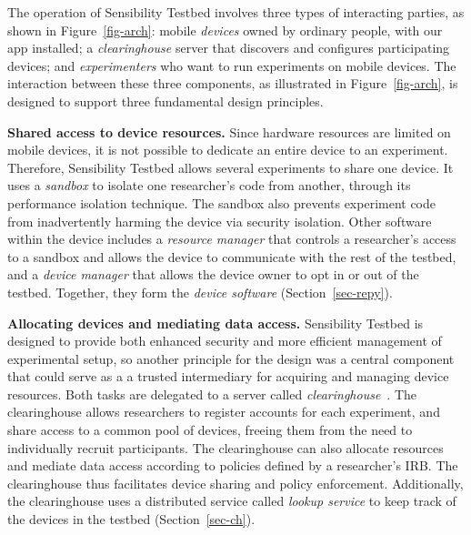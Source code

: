 The operation of Sensibility Testbed  involves three types of interacting
parties, as shown in Figure~\ref{fig-arch}: mobile \textit{devices} 
owned by ordinary people, with our app installed; a 
\textit{clearinghouse} server that discovers and configures
participating devices; and \textit{experimenters} who want to run
experiments on mobile devices. The interaction between these three 
components, as illustrated in Figure~\ref{fig-arch}, is designed to 
support three fundamental design principles.

\textbf{Shared access to device resources.} 
Since hardware resources are limited on mobile devices, it is 
not possible to dedicate an entire device to an experiment. Therefore, 
Sensibility Testbed allows several experiments to share one device. It 
uses a \textit{sandbox} to isolate one researcher's code from 
 another, through its performance isolation technique. The sandbox 
also prevents experiment code from inadvertently harming the device
via security isolation. Other software within the device includes a 
\textit{resource manager} that controls a researcher's access to a sandbox 
and allows the device to communicate with the rest of the testbed, 
and a \textit{device manager} that allows the device 
owner to opt in or out of the testbed. Together, they form the
\textit{device software} (Section~\ref{sec-repy}).

\textbf{Allocating devices and mediating data access.}
Sensibility Testbed is designed to provide both enhanced security and 
more efficient management of experimental setup, so another principle 
for the design was a central component that could serve as a a trusted 
intermediary for acquiring and managing device resources. Both tasks 
are delegated to  a server called \textit{clearinghouse}~\cite{ch}. The 
clearinghouse allows researchers to 
register accounts for each experiment, and share access to a common 
pool of devices, freeing them from the need to individually recruit participants. 
The clearinghouse can also allocate resources and mediate 
data access according to policies defined by a researcher's IRB. The 
clearinghouse thus facilitates device sharing and policy enforcement.  
Additionally, the clearinghouse uses a distributed service called 
\textit{lookup service} to keep track of the devices in the testbed 
(Section~\ref{sec-ch}).

